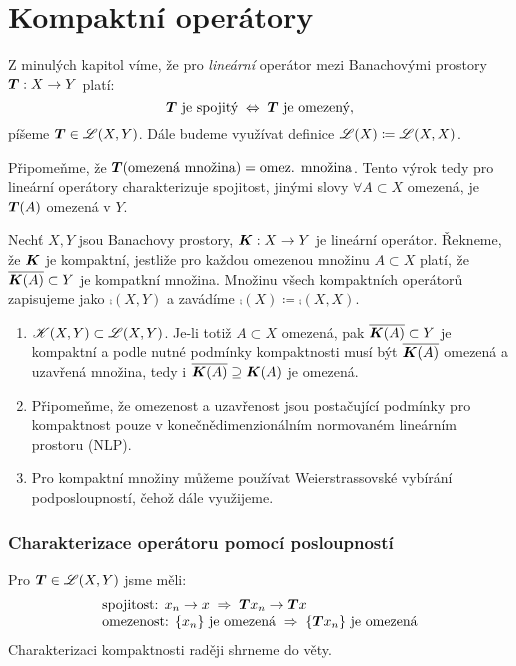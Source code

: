 \section{Kompaktní operátory}

Z minulých kapitol víme, že pro \emph{lineární} operátor mezi Banachovými prostory $\boldsymbol{T}: X \to Y$ platí: 
$$\boldsymbol{T} \text{ je spojitý}\;\Leftrightarrow\;\boldsymbol{T} \text{ je omezený},$$
píšeme $\boldsymbol{T}\in \mathscr{L}(X,Y)$. Dále budeme využívat definice $\mathscr{L}(X)\coloneqq \mathscr{L}(X,X)$. 

Připomeňme, že $\boldsymbol{T}(\text{omezená množina})=\text{omez. množina}$. Tento výrok tedy pro lineární operátory charakterizuje spojitost, jinými slovy $\forall A\subset{X}$ omezená, je $\boldsymbol{T}(A)$ omezená v $Y$.

\begin{definition}
Nechť $X,Y$ jsou Banachovy prostory, $\boldsymbol{K}: X \to Y$ je lineární operátor. Řekneme, že $\boldsymbol{K}$ je kompaktní, jestliže pro každou omezenou množinu $A \subset X$ platí, že $\overline{\boldsymbol{K}(A)} \subset Y$ je kompatkní množina. Množinu všech kompaktních operátorů zapisujeme jako $\comp(X,Y)$ a zavádíme $\comp(X) \coloneqq \comp(X,X)$.
\end{definition}

\begin{remark}\qquad
\begin{enumerate}
    \item $\mathscr{K}(X,Y) \subset \mathscr{L}(X,Y)$. Je-li totiž $A \subset X$ omezená, pak $\overline{\boldsymbol{K}(A)} \subset Y$ je kompaktní a podle nutné podmínky kompaktnosti musí být $\overline{\boldsymbol{K}(A)} $ omezená a uzavřená množina, tedy i $\overline{\boldsymbol{K}(A)}\supseteq \boldsymbol{K}(A)$ je omezená.
    \item Připomeňme, že omezenost a uzavřenost jsou postačující podmínky pro kompaktnost pouze v konečnědimenzionálním normovaném lineárním prostoru (NLP).
    \item Pro kompaktní množiny můžeme používat Weierstrassovské vybírání podposloupností, čehož dále využijeme.
\end{enumerate}
\end{remark}

\subsubsection{Charakterizace operátoru pomocí posloupností}
Pro $\boldsymbol{T}\in \mathscr{L}(X,Y)$ jsme měli:
$$\begin{array}{l}
     \text{spojitost: }x_n\rightarrow x\;\Rightarrow \; \boldsymbol{T}x_n\rightarrow \boldsymbol{T}x\\
\text{omezenost: }\{x_n\}\text{ je omezená}\;\Rightarrow \;\{\boldsymbol{T} x_n\} \text{ je omezená}
\end{array}$$ 
Charakterizaci kompaktnosti raději shrneme do věty.

